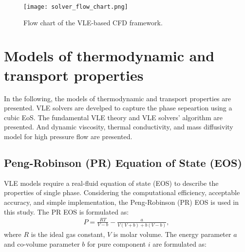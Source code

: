 \begin{figure*}[htbp]
\centering
\texttt{[image: solver\_flow\_chart.png]}
\caption{Flow chart of the VLE-based CFD framework.}
\label{FC_CFD} 
\end{figure*}



\section{Models of thermodynamic and transport properties}
In the following, the models of thermodynamic and transport properties are presented. VLE solvers are develped to capture the phase sepeartion  using a cubic EoS. The fundamental VLE theory and VLE solvers' algorithm are presented. And dynamic viscosity, thermal conductivity, and mass diffusivity model for high pressure flow are presented.

\subsection{Peng-Robinson (PR) Equation of State (EOS)}
VLE models require a real-fluid equation of state (EOS) to describe the properties of single phase. Considering the computational efficiency, acceptable accuracy, and simple implementation, the Peng-Robinson (PR) EOS \cite{peng1976new} is used in this study. The PR EOS is formulated as:
\begin{align}
    P=\frac{RT}{V-b}-\frac{a}{V\left(V+b\right)+b\left(V-b\right)}, %
    \label{eq:preos}
\end{align}
where $R$ is the ideal gas constant, $V$ is molar volume. The energy parameter $a$ and co-volume parameter $b$ for pure component $i$ are formulated as:

